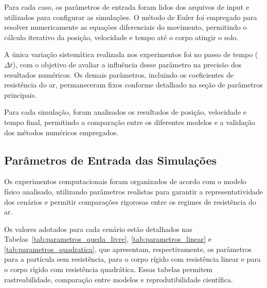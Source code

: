 Para cada caso, os parâmetros de entrada foram lidos dos arquivos de input e utilizados para configurar as simulações. O método de Euler foi empregado para resolver numericamente as equações diferenciais do movimento, permitindo o cálculo iterativo da posição, velocidade e tempo até o corpo atingir o solo.

A única variação sistemática realizada nos experimentos foi no passo de tempo ($\Delta t$), com o objetivo de avaliar a influência desse parâmetro na precisão dos resultados numéricos. Os demais parâmetros, incluindo os coeficientes de resistência do ar, permaneceram fixos conforme detalhado na seção de parâmetros principais.

Para cada simulação, foram analisados os resultados de posição, velocidade e tempo final, permitindo a comparação entre os diferentes modelos e a validação dos métodos numéricos empregados.

\subsection{Parâmetros de Entrada das Simulações}
\label{sec_parametros_entrada}

Os experimentos computacionais foram organizados de acordo com o modelo físico analisado, utilizando parâmetros realistas para garantir a representatividade dos cenários e permitir comparações rigorosas entre os regimes de resistência do ar.

Os valores adotados para cada cenário estão detalhados nas Tabelas~\ref{tab:parametros_queda_livre}, \ref{tab:parametros_linear} e \ref{tab:parametros_quadratica}, que apresentam, respectivamente, os parâmetros para a partícula sem resistência, para o corpo rígido com resistência linear e para o corpo rígido com resistência quadrática. Essas tabelas permitem rastreabilidade, comparação entre modelos e reprodutibilidade científica.


